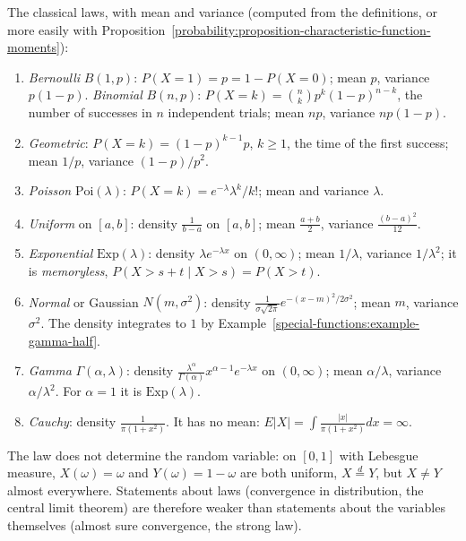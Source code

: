 \begin{example}\label{probability:example-classical-distributions}
The classical laws, with mean and variance (computed from the definitions, or more easily with Proposition~\ref{probability:proposition-characteristic-function-moments}):
\begin{enumerate}
\item \emph{Bernoulli} $B(1, p)$: $P(X = 1) = p = 1 - P(X = 0)$; mean $p$, variance $p(1 - p)$. \emph{Binomial} $B(n, p)$: $P(X = k) = \binom nkp^k(1 - p)^{n-k}$, the number of successes in $n$ independent trials; mean
$np$, variance $np(1 - p)$.
\item \emph{Geometric}: $P(X = k) = (1 - p)^{k-1}p$, $k \geq 1$, the time of the first success; mean $1/p$, variance $(1 - p)/p^2$.
\item \emph{Poisson} $\mathrm{Poi}(\lambda)$: $P(X = k) = e^{-\lambda}\lambda^k/k!$; mean and variance $\lambda$.
\item \emph{Uniform} on $[a, b]$: density $\frac{1}{b - a}$ on $[a, b]$; mean $\frac{a + b}{2}$, variance $\frac{(b - a)^2}{12}$.
\item \emph{Exponential} $\mathrm{Exp}(\lambda)$: density $\lambda e^{-\lambda x}$ on $(0, \infty)$; mean $1/\lambda$, variance $1/\lambda^2$; it is \emph{memoryless}, $P(X > s + t \mid X > s) = P(X > t)$.
\item \emph{Normal} or Gaussian $N(m, \sigma^2)$: density $\frac{1}{\sigma\sqrt{2\pi}}e^{-(x - m)^2/2\sigma^2}$; mean $m$, variance $\sigma^2$. The density integrates to $1$ by Example~\ref{special-functions:example-gamma-half}.
\item \emph{Gamma} $\Gamma(\alpha, \lambda)$: density $\frac{\lambda^\alpha}{\Gamma(\alpha)}x^{\alpha-1}e^{-\lambda x}$ on $(0, \infty)$; mean $\alpha/\lambda$, variance $\alpha/\lambda^2$. For $\alpha = 1$ it is $\mathrm{Exp}(\lambda)$.
\item \emph{Cauchy}: density $\frac{1}{\pi(1 + x^2)}$. It has no mean: $E|X| = \int\frac{|x|}{\pi(1 + x^2)}dx = \infty$.
\end{enumerate}
\end{example}

\begin{counterexample}\label{probability:counterexample-law-not-variable}
The law does not determine the random variable: on $[0, 1]$ with Lebesgue measure, $X(\omega) = \omega$ and $Y(\omega) = 1 - \omega$ are both uniform, $X \overset{d}{=} Y$, but $X \neq Y$ almost everywhere. Statements about
laws (convergence in distribution, the central limit theorem) are therefore weaker than statements about the variables themselves (almost sure convergence, the strong law).
\end{counterexample}

